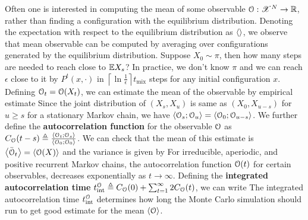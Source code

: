 \documentclass[letterpaper,english,10pt]{article}
\begin{document}
Often one is interested in computing the mean of some observable $\mathcal{O}: \mathscr{X}^N \to \mathbb{R}$, 
rather than finding a configuration with the equilibrium distribution. 
Denoting the expectation with respect to the equilibrium distribution as $\left\langle\right\rangle$, 
we observe that 
mean observable can be computed by averaging over configurations generated by the equilibrium distribution. 
Suppose $X_0 \sim \pi$, then how many steps are needed to reach close to $\mathbb{E} X_s$? 
In practice, we don't know $\pi$ and we can reach $\epsilon$ close to it by $P^t(x,\cdot)$ in $\left\lceil\ln \frac{1}{\epsilon}\right\rceil t_{\text{mix}}$ steps for any initial configuration $x$.  
Defining $\mathcal{O}_t = \mathcal{O}(X_t)$, we can estimate the mean of the observable by empirical estimate 
Since the joint distribution of $(X_s, X_u)$ is same as $(X_0, X_{u-s})$ for $u \ge s$ for a stationary Markov chain, 
we have $\left\langle\mathcal{O}_s; \mathcal{O}_u\right\rangle = \left\langle\mathcal{O}_0; \mathcal{O}_{u-s}\right\rangle$. 
We further define the \textbf{autocorrelation function} for the observable $\mathcal{O}$ as $C_{\mathcal{O}}(t-s) \triangleq \frac{\left\langle\mathcal{O}_t; \mathcal{O}_s\right\rangle}{\left\langle\mathcal{O}_0; \mathcal{O}_0\right\rangle}$. 
We can check that the mean of this estimate is $\left\langle\bar{\mathcal{O}}_t\right\rangle = \left\langle\mathcal{O}(X)\right\rangle$ and the variance is given by 
For irreducible, aperiodic, and positive recurrent Markov chains, the autocorrelation function $\mathcal{O}(t)$ for certain observables, decreases exponentially as $t \to \infty$. 
Defining the \textbf{integrated autocorrelation time} $t^{\mathcal{O}}_{\text{int}} \triangleq C_{\mathcal{O}}(0) + \sum_{t=1}^\infty 2C_{\mathcal{O}}(t)$, we can write 
The integrated autocorrelation time $t^{\mathcal{O}}_{\text{int}}$ determines how long the Monte Carlo simulation should run to get good estimate for the mean $\left\langle\mathcal{O}\right\rangle$. 
\begin{shaded*}
\begin{exmp}
\end{exmp}
\end{shaded*}
\end{document}

